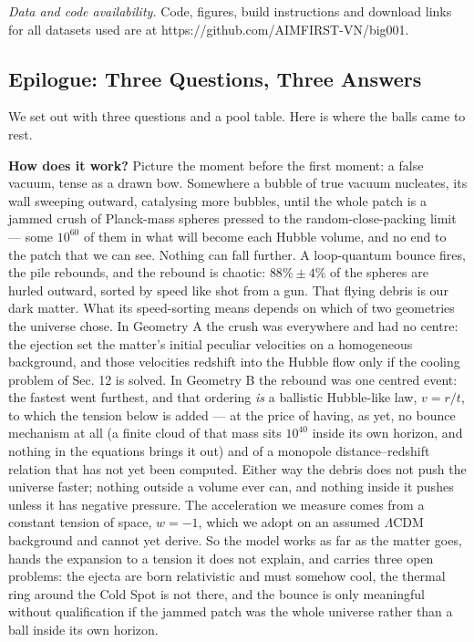 \documentclass[
]{article}
\begin{document}
\emph{Data and code availability.} Code, figures, build instructions and
download links for all datasets used are at
https://github.com/AIMFIRST-VN/big001.

\hypertarget{epilogue-three-questions-three-answers}{%
\subsection{\texorpdfstring{\textbf{Epilogue: Three Questions, Three
Answers}}{Epilogue: Three Questions, Three Answers}}\label{epilogue-three-questions-three-answers}}

We set out with three questions and a pool table. Here is where the
balls came to rest.

\textbf{How does it work?} Picture the moment before the first moment: a
false vacuum, tense as a drawn bow. Somewhere a bubble of true vacuum
nucleates, its wall sweeping outward, catalysing more bubbles, until the
whole patch is a jammed crush of Planck-mass spheres pressed to the
random-close-packing limit --- some \(10^{60}\) of them in what will
become each Hubble volume, and no end to the patch that we can see.
Nothing can fall further. A loop-quantum bounce fires, the pile
rebounds, and the rebound is chaotic: \(88\% \pm 4\%\) of the spheres
are hurled outward, sorted by speed like shot from a gun. That flying
debris is our dark matter. What its speed-sorting means depends on which
of two geometries the universe chose. In Geometry A the crush was
everywhere and had no centre: the ejection set the matter's initial
peculiar velocities on a homogeneous background, and those velocities
redshift into the Hubble flow only if the cooling problem of Sec. 12 is
solved. In Geometry B the rebound was one centred event: the fastest
went furthest, and that ordering \emph{is} a ballistic Hubble-like law,
\(v = r/t\), to which the tension below is added --- at the price of
having, as yet, no bounce mechanism at all (a finite cloud of that mass
sits \(10^{40}\) inside its own horizon, and nothing in the equations
brings it out) and of a monopole distance--redshift relation that has
not yet been computed. Either way the debris does not push the universe
faster; nothing outside a volume ever can, and nothing inside it pushes
unless it has negative pressure. The acceleration we measure comes from
a constant tension of space, \(w = -1\), which we adopt on an assumed
\(\Lambda\)CDM background and cannot yet derive. So the model works as
far as the matter goes, hands the expansion to a tension it does not
explain, and carries three open problems: the ejecta are born
relativistic and must somehow cool, the thermal ring around the Cold
Spot is not there, and the bounce is only meaningful without
qualification if the jammed patch was the whole universe rather than a
ball inside its own horizon.
\end{document}
